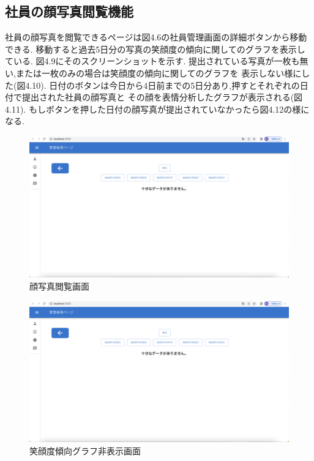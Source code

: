 \subsection{社員の顔写真閲覧機能}
社員の顔写真を閲覧できるページは図4.6の社員管理画面の詳細ボタンから移動できる.
移動すると過去5日分の写真の笑顔度の傾向に関してのグラフを表示している.
図4.9にそのスクリーンショットを示す.
提出されている写真が一枚も無い,または一枚のみの場合は笑顔度の傾向に関してのグラフを
表示しない様にした(図4.10).
日付のボタンは今日から4日前までの5日分あり,押すとそれぞれの日付で提出された社員の顔写真と
その顔を表情分析したグラフが表示される(図4.11).
もしボタンを押した日付の顔写真が提出されていなかったら図4.12の様になる.

\begin{figure}[!h]
	\begin{center}
			\includegraphics[scale=0.3, clip]{./img/sample9.png}
			\caption{顔写真閲覧画面}
			\label{fig:図の名前}
	\end{center}
\end{figure}

\begin{figure}[!h]
	\begin{center}
			\includegraphics[scale=0.3, clip]{./img/sample9.png}
			\caption{笑顔度傾向グラフ非表示画面}
			\label{fig:図の名前}
	\end{center}
\end{figure}

